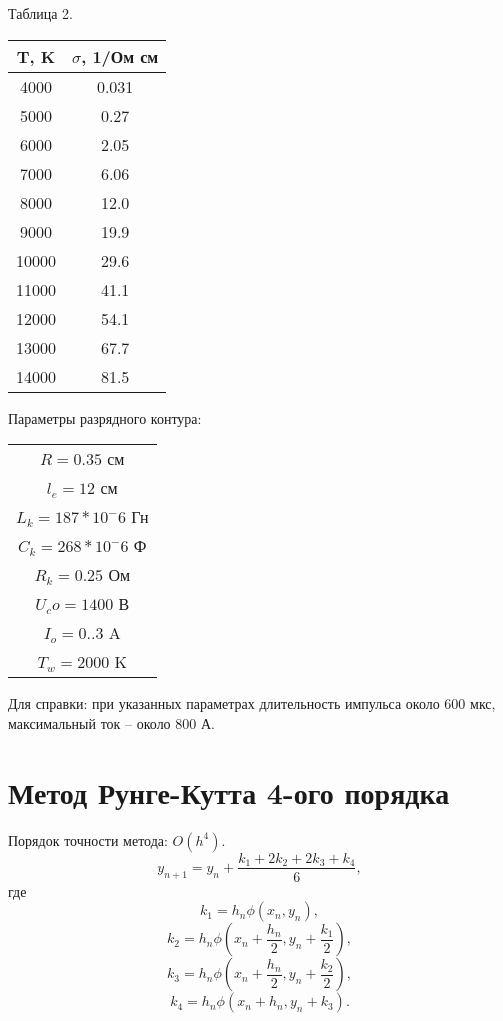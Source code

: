 \begin{center}
	Таблица 2. \\
	\begin{tabular}{ |c|c| }
		\hline
		T, K & $\sigma$, 1/Ом см \\ \hline
		4000 & 0.031 \\
		5000 & 0.27 \\
		6000 & 2.05 \\
		7000 & 6.06 \\
		8000 & 12.0 \\
		9000 & 19.9 \\
		10000 & 29.6 \\
		11000 & 41.1 \\
		12000 & 54.1 \\
		13000 & 67.7 \\
		14000 & 81.5 \\
		\hline
	\end{tabular}
\end{center}

\begin{center}
	Параметры разрядного контура: \\
	\begin{tabular}{ c }
		$R = 0.35$ см \\
		$l_e = 12$ см \\
		$L_k =1 87 * 10^-6$ Гн \\
		$C_k = 268 * 10^-6$ Ф \\ 
		$R_k = 0.25$ Ом \\
		$U_co = 1400$ В \\
		$I_o = 0..3$ A \\
		$T_w = 2000$ K \\
	\end{tabular}
\end{center}
Для справки: при указанных параметрах длительность импульса около 600 мкс, максимальный ток – около 800 А.









\section*{Метод Рунге-Кутта 4-ого порядка}

Порядок точности метода: $O(h^4)$.
$$y_{n+1} = y_n + \frac{k_1 + 2k_2 + 2k_3 + k_4}{6},$$
где 
$$k_1 = h_n \phi(x_n, y_n),$$
$$k_2 = h_n \phi(x_n + \frac{h_n}{2}, y_n + \frac{k_1}{2}),$$
$$k_3 = h_n \phi(x_n + \frac{h_n}{2}, y_n + \frac{k_2}{2}),$$
$$k_4 = h_n \phi(x_n + h_n, y_n + k_3).$$



